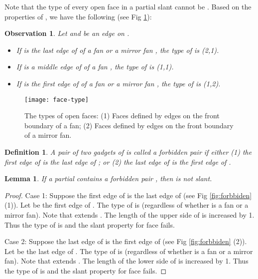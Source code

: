 \documentclass[11pt]{article}
\newtheorem{definition}[figure]{Definition}
\newtheorem{lemma}[figure]{Lemma}
\newtheorem{observation}[figure]{Observation}
\begin{document}
Note that the type of every open  face in a partial slant
 cannot be . Based on the properties of , we
have the following (see Fig \ref{fig:face-type}):

\begin{observation}
Let  and  be an edge on .
\begin{itemize}
\item If  is the last edge of  of a fan or a mirror fan ,
the type of  is (2,1).
\item If  is a middle edge of  of a fan ,
the type of  is (1,1).
\item If  is the first edge of  of a fan or a mirror fan ,
the type of  is (1,2).
\end{itemize}
\end{observation}

\begin{figure}[ht]
\begin{center}
\texttt{[image: face-type]}
  \centering
\caption{The types of open  faces:
(1) Faces defined by edges on the front boundary of a fan;
(2) Faces defined by edges on the front boundary of a mirror fan.}
\label{fig:face-type}
\end{center}
\end{figure}
\vspace{-0.25in}

\begin{definition}\label{def:forbidden}
A pair  of two gadgets of  is called a {\em forbidden pair} if either
(1) the first edge of  is the last edge of ; or
(2) the last edge of  is the first edge of .
\end{definition}

\begin{lemma}\label{lemma:forbidden}
If a partial   contains a forbidden pair ,
then  is not slant.
\end{lemma}

\begin{proof}
Case 1: Suppose the first edge  of  is the last edge
of  (see Fig \ref{fig:forbbiden} (1)). Let  be the
first edge of . The type of  is
 (regardless of whether  is a fan or a mirror fan). Note
that  extends .
The length of the upper side of  is increased
by 1. Thus the type of  is  and
the slant property for  face fails.

Case 2: Suppose the last edge  of  is the first edge
of  (see Fig \ref{fig:forbbiden} (2)). Let  be
the last edge of . The type of 
is  (regardless of whether  is a fan or a mirror fan).
Note that  extends .
The length of the lower side of  is increased
by 1. Thus the type of  is  and
the slant property for  face fails.
\end{proof}
\end{document}
